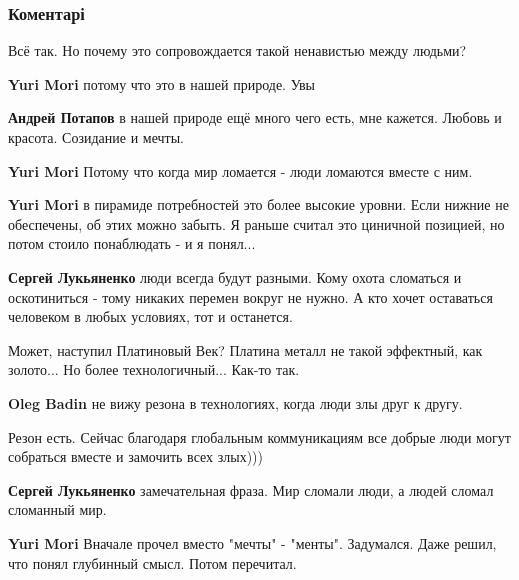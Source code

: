  
 
 
 
 
\subsubsection{Коментарі}
\label{sec:26_11_2021.fb.lukjanenko_sergej.pisatel.1.zolotoj_vek.cmt}

\begin{itemize} %
Всё так. Но почему это сопровождается такой ненавистью между людьми?

\begin{itemize} %
\textbf{Yuri Mori} потому что это в нашей природе. Увы

\textbf{Андрей Потапов} в нашей природе ещё много чего есть, мне кажется. Любовь и красота. Созидание и мечты.

\textbf{Yuri Mori} Потому что когда мир ломается - люди ломаются вместе с ним.

\textbf{Yuri Mori} в пирамиде потребностей это более высокие уровни. Если нижние не обеспечены, об этих можно забыть. Я раньше считал это циничной позицией, но потом стоило понаблюдать - и я понял...

\textbf{Сергей Лукьяненко} люди всегда будут разными. Кому охота сломаться и оскотиниться - тому никаких перемен вокруг не нужно. А кто хочет оставаться человеком в любых условиях, тот и останется.

Может, наступил Платиновый Век? Платина металл не такой эффектный, как золото... Но более технологичный... Как-то так.

\textbf{Oleg Badin} не вижу резона в технологиях, когда люди злы друг к другу.

Резон есть. Сейчас благодаря глобальным коммуникациям все добрые люди могут собраться вместе и замочить всех злых)))

\textbf{Сергей Лукьяненко} замечательная фраза. Мир сломали люди, а людей сломал сломанный мир.

\textbf{Yuri Mori} Вначале прочел вместо "мечты" - "менты". Задумался. Даже решил, что понял глубинный смысл. Потом перечитал.


\end{itemize}
\end{itemize}
